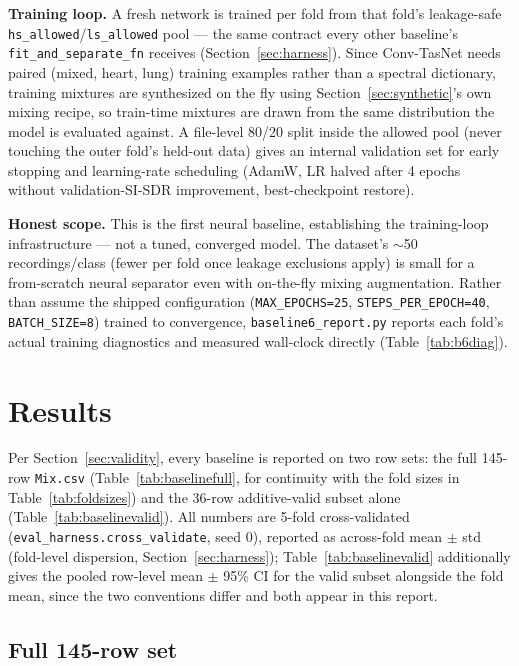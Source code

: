 \documentclass[11pt]{article}
\begin{document}
\textbf{Training loop.} A fresh network is trained per fold from that
fold's leakage-safe \texttt{hs\_allowed}/\texttt{ls\_allowed} pool --- the
same contract every other baseline's \texttt{fit\_and\_separate\_fn}
receives (Section~\ref{sec:harness}). Since Conv-TasNet needs paired
(mixed, heart, lung) training examples rather than a spectral dictionary,
training mixtures are synthesized on the fly using
Section~\ref{sec:synthetic}'s own mixing recipe, so train-time mixtures are
drawn from the same distribution the model is evaluated against. A
file-level 80/20 split inside the allowed pool (never touching the outer
fold's held-out data) gives an internal validation set for early stopping
and learning-rate scheduling (AdamW, LR halved after 4 epochs without
validation-SI-SDR improvement, best-checkpoint restore).

\textbf{Honest scope.} This is the first neural baseline, establishing the
training-loop infrastructure --- not a tuned, converged model. The
dataset's $\sim$50 recordings/class (fewer per fold once leakage exclusions
apply) is small for a from-scratch neural separator even with on-the-fly
mixing augmentation. Rather than assume the shipped configuration
(\texttt{MAX\_EPOCHS=25}, \texttt{STEPS\_PER\_EPOCH=40}, \texttt{BATCH\_SIZE=8})
trained to convergence, \texttt{baseline6\_report.py} reports each fold's
actual training diagnostics and measured wall-clock directly
(Table~\ref{tab:b6diag}).

\section{Results}
\label{sec:results}

Per Section~\ref{sec:validity}, every baseline is reported on two row sets:
the full 145-row \texttt{Mix.csv} (Table~\ref{tab:baselinefull}, for
continuity with the fold sizes in Table~\ref{tab:foldsizes}) and the 36-row
additive-valid subset alone (Table~\ref{tab:baselinevalid}). All numbers are
5-fold cross-validated (\texttt{eval\_harness.cross\_validate}, seed 0),
reported as across-fold mean $\pm$ std (fold-level dispersion,
Section~\ref{sec:harness}); Table~\ref{tab:baselinevalid} additionally gives
the pooled row-level mean $\pm$ 95\% CI for the valid subset alongside the
fold mean, since the two conventions differ and both appear in this
report.

\subsection{Full 145-row set}
\end{document}
